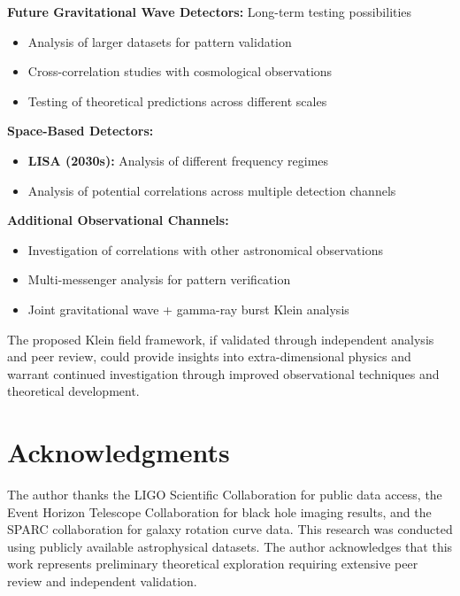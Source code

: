 \documentclass[12pt]{iopart}
\begin{document}
\textbf{Future Gravitational Wave Detectors:} Long-term testing possibilities
\begin{itemize}
\item Analysis of larger datasets for pattern validation
\item Cross-correlation studies with cosmological observations
\item Testing of theoretical predictions across different scales
\end{itemize}

\textbf{Space-Based Detectors:}
\begin{itemize}
\item \textbf{LISA (2030s):} Analysis of different frequency regimes
\item Analysis of potential correlations across multiple detection channels
\end{itemize}

\textbf{Additional Observational Channels:}
\begin{itemize}
\item Investigation of correlations with other astronomical observations
\item Multi-messenger analysis for pattern verification
\item Joint gravitational wave + gamma-ray burst Klein analysis
\end{itemize}

The proposed Klein field framework, if validated through independent analysis and peer review, could provide insights into extra-dimensional physics and warrant continued investigation through improved observational techniques and theoretical development.

\section*{Acknowledgments}
The author thanks the LIGO Scientific Collaboration for public data access, the Event Horizon Telescope Collaboration for black hole imaging results, and the SPARC collaboration for galaxy rotation curve data. This research was conducted using publicly available astrophysical datasets. The author acknowledges that this work represents preliminary theoretical exploration requiring extensive peer review and independent validation.
\end{document}

